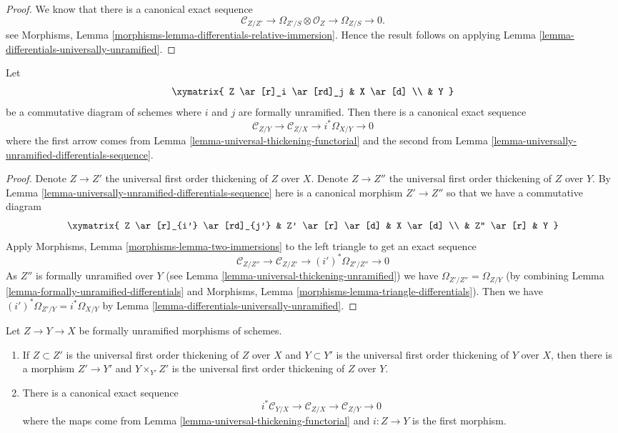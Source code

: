 \begin{proof}
We know that there is a canonical exact sequence
$$
\mathcal{C}_{Z/Z'} \to
\Omega_{Z'/S} \otimes \mathcal{O}_Z \to
\Omega_{Z/S} \to 0.
$$
see
Morphisms, Lemma \ref{morphisms-lemma-differentials-relative-immersion}.
Hence the result follows on applying
Lemma \ref{lemma-differentials-universally-unramified}.
\end{proof}

\begin{lemma}
\label{lemma-two-unramified-morphisms}
Let
$$
\xymatrix{
Z \ar[r]_i \ar[rd]_j & X \ar[d] \\
& Y
}
$$
be a commutative diagram of schemes where $i$ and $j$ are formally
unramified. Then there is a canonical exact sequence
$$
\mathcal{C}_{Z/Y} \to
\mathcal{C}_{Z/X} \to
i^*\Omega_{X/Y} \to 0
$$
where the first arrow comes from
Lemma \ref{lemma-universal-thickening-functorial}
and the second from
Lemma \ref{lemma-universally-unramified-differentials-sequence}.
\end{lemma}

\begin{proof}
Denote $Z \to Z'$ the universal first order thickening of $Z$ over $X$.
Denote $Z \to Z''$ the universal first order thickening of $Z$ over $Y$.
By
Lemma \ref{lemma-universally-unramified-differentials-sequence}
here is a canonical morphism $Z' \to Z''$ so that we have a commutative
diagram
$$
\xymatrix{
Z \ar[r]_{i'} \ar[rd]_{j'} & Z' \ar[r] \ar[d] & X \ar[d] \\
& Z'' \ar[r] & Y
}
$$
Apply
Morphisms, Lemma \ref{morphisms-lemma-two-immersions}
to the left triangle to get an exact sequence
$$
\mathcal{C}_{Z/Z''} \to
\mathcal{C}_{Z/Z'} \to
(i')^*\Omega_{Z'/Z''} \to 0
$$
As $Z''$ is formally unramified over $Y$ (see
Lemma \ref{lemma-universal-thickening-unramified})
we have
$\Omega_{Z'/Z''} = \Omega_{Z/Y}$ (by combining
Lemma \ref{lemma-formally-unramified-differentials}
and
Morphisms, Lemma \ref{morphisms-lemma-triangle-differentials}).
Then we have $(i')^*\Omega_{Z'/Y} = i^*\Omega_{X/Y}$ by
Lemma \ref{lemma-differentials-universally-unramified}.
\end{proof}

\begin{lemma}
\label{lemma-transitivity-conormal}
Let $Z \to Y \to X$ be formally unramified morphisms of schemes.
\begin{enumerate}
\item If $Z \subset Z'$ is the universal first order thickening of $Z$
over $X$ and $Y \subset Y'$ is the universal first order thickening of $Y$
over $X$, then there is a morphism $Z' \to Y'$ and $Y \times_{Y'} Z'$ is
the universal first order thickening of $Z$ over $Y$.
\item There is a canonical exact sequence
$$
i^*\mathcal{C}_{Y/X} \to
\mathcal{C}_{Z/X} \to
\mathcal{C}_{Z/Y} \to 0
$$
where the maps come from
Lemma \ref{lemma-universal-thickening-functorial}
and $i : Z \to Y$ is the first morphism.
\end{enumerate}
\end{lemma}

